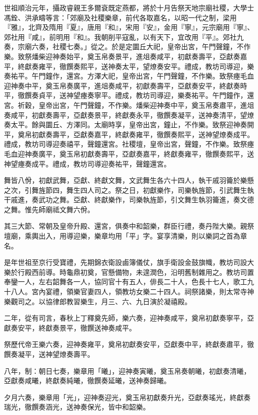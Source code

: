 \begin{pinyinscope}
世祖順治元年，攝政睿親王多爾袞既定燕都，將於十月告祭天地宗廟社稷，大學士馮銓、洪承疇等言：「郊廟及社稷樂章，前代各取嘉名，以昭一代之制，梁用『雅』，北齊及隋用『夏』，唐用『和』，宋用『安』，金用『寧』，元宗廟用『寧』、郊社用『咸』，前明用『和』。我朝削平寇亂，以有天下，宜改用『平』。郊社九奏，宗廟六奏，社稷七奏。」從之。於是定圜丘大祀，皇帝出宮，午門聲鐘，不作樂。致祭燔柴迎神奏始平，奠玉帛奏景平，進俎奏咸平，初獻奏壽平，亞獻奏嘉平，終獻奏雍平，徹饌奏熙平，送神奏太平，望燎奏安平。禮成，教坊司導迎，樂奏祐平。午門鐘作，還宮。方澤大祀，皇帝出宮，午門聲鐘，不作樂。致祭瘞毛血迎神奏中平，奠玉帛奏廣平，進俎奏咸平，初獻奏壽平，亞獻奏安平，終獻奏時平，徹饌奏貞平，送神望瘞奏寧平。禮成，教坊司導迎，樂奏祐平。午門鐘作，還宮。祈穀，皇帝出宮，午門聲鐘，不作樂。燔柴迎神奏中平，奠玉帛奏肅平，進俎奏咸平，初獻奏壽平，亞獻奏景平，終獻奏永平，徹饌奏凝平，送神奏清平，望燎奏太平。餘與圜丘、方澤同。太廟時享，皇帝出宮，鐘止，不作樂。致祭迎神奏開平，奠帛初獻奏壽平，亞獻奏嘉平，終獻奏雍平，徹饌奏熙平，送神望燎奏成平。禮成，教坊司導迎奏禧平，聲鐘還宮。社稷壇，皇帝出宮，聲鐘，不作樂。致祭瘞毛血迎神奏廣平，奠玉帛初獻奏壽平，亞獻奏嘉平，終獻奏雍平，徹饌奏熙平，送神望瘞奏成平。禮成，教坊司導迎奏祐平，聲鐘還宮。

舞皆八佾，初獻武舞，亞獻、終獻文舞，文武舞生各六十四人，執干戚羽籥於樂懸之次，引舞旌節四，舞生四人司之。祭之日，初獻樂作，司樂執旌節，引武舞生執干戚進，奏武功之舞。亞獻、終獻樂作，司樂執旌節，引文舞生執羽籥進，奏文德之舞。惟先師廟祗文舞六佾。

其三大節、常朝及皇帝升殿、還宮，俱奏中和韶樂，群臣行禮，奏丹陛大樂。親祭壇廟，乘輿出入，用導迎樂，樂章均用「平」字。宴享清樂，則以樂詞之首為章名。

是年世祖至京行受寶禮，先期錦衣衛設鹵簿儀仗，旗手衛設金鼓旗幟，教坊司設大樂於行殿西前導。時龜鼎初奠，官懸備物，未遑潤色，沿明舊制雜用之。教坊司置奉鑾一人，左右韶舞各一人，協同官十有五人，俳長二十人，色長十七人，歌工九十八人。宮內宴禮，領樂官妻四人，領教坊女樂二十四人。祠祭諸樂，則太常寺神樂觀司之。以協律郎教習樂生，月三、六、九日演於凝禧殿。

二年，從有司言，春秋上丁釋奠先師，樂六奏，迎神奏咸平，奠帛初獻奏寧平，亞獻奏安平，終獻奏景平，徹饌送神奏咸平。

祭歷代帝王樂六奏，迎神奏雍平，奠帛初獻奏安平，亞獻奏中平，終獻奏肅平，徹饌奏凝平，送神望燎奏壽平。

八年，制：朝日七奏，樂章用「曦」，迎神奏寅曦，奠玉帛奏朝曦，初獻奏清曦，亞獻奏咸曦，終獻奏純曦，徹饌奏延曦，送神奏歸曦。

夕月六奏，樂章用「光」，迎神奏迎光，奠玉帛初獻奏升光，亞獻奏瑤光，終獻奏瑞光，徹饌奏涵光，送神奏保光，皆中和韶樂。


\end{pinyinscope}
